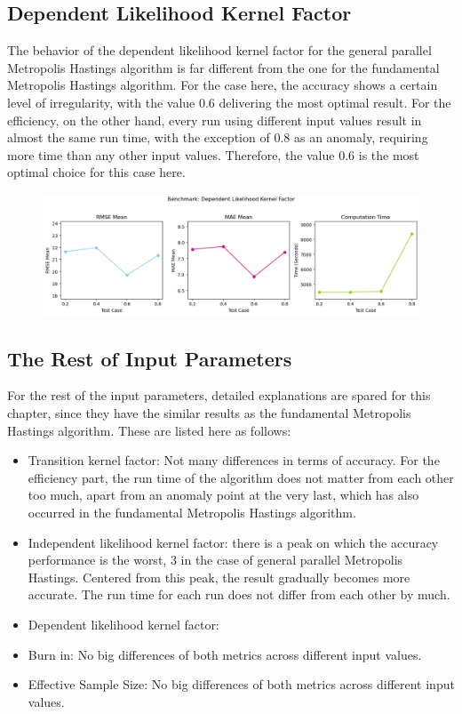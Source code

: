 \subsection{Dependent Likelihood Kernel Factor}
The behavior of the dependent likelihood kernel factor for the general parallel Metropolis Hastings algorithm is far different from the one for the fundamental Metropolis Hastings algorithm. For the case here, the accuracy shows a certain level of irregularity, with the value $0.6$ delivering the most optimal result. For the efficiency, on the other hand, every run using different input values result in almost the same run time, with the exception of $0.8$ as an anomaly, requiring more time than any other input values. Therefore, the value $0.6$ is the most optimal choice for this case here.

\begin{figure}[H]
    \centering
    \includegraphics[width=1\textwidth]{figures/gpmh/dependent_likelihood_kernel_factor.png}
    \captionsetup{width=.8\textwidth}
    \caption{}
    \label{fig:enter-label}
\end{figure}


\subsection{The Rest of Input Parameters}
For the rest of the input parameters, detailed explanations are spared for this chapter, since they have the similar results as the fundamental Metropolis Hastings algorithm. These are listed here as follows: 
\begin{itemize}
    \item Transition kernel factor: Not many differences in terms of accuracy. For the efficiency part, the run time of the algorithm does not matter from each other too much, apart from an anomaly point at the very last, which has also occurred in the fundamental Metropolis Hastings algorithm.
    \item Independent likelihood kernel factor: there is a peak on which the accuracy performance is the worst, $3$ in the case of general parallel Metropolis Hastings. Centered from this peak, the result gradually becomes more accurate. The run time for each run does not differ from each other by much.
    \item Dependent likelihood kernel factor:
    \item Burn in: No big differences of both metrics across different input values.
    \item Effective Sample Size: No big differences of both metrics across different input values.
\end{itemize}

